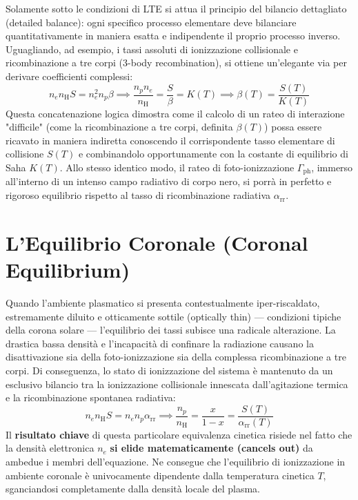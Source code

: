 Solamente sotto le condizioni di LTE si attua il principio del bilancio dettagliato (detailed balance): ogni specifico processo elementare deve bilanciare quantitativamente in maniera esatta e indipendente il proprio processo inverso. Uguagliando, ad esempio, i tassi assoluti di ionizzazione collisionale e ricombinazione a tre corpi (3-body recombination), si ottiene un'elegante via per derivare coefficienti complessi:
\begin{equation}
n_e n_{\text{H}} S = n_e^2 n_p \beta \implies \frac{n_p n_e}{n_{\text{H}}} = \frac{S}{\beta} = K(T) \implies \beta(T) = \frac{S(T)}{K(T)}
\end{equation}
Questa concatenazione logica dimostra come il calcolo di un rateo di interazione "difficile" (come la ricombinazione a tre corpi, definita $\beta(T)$) possa essere ricavato in maniera indiretta conoscendo il corrispondente tasso elementare di collisione $S(T)$ e combinandolo opportunamente con la costante di equilibrio di Saha $K(T)$. Allo stesso identico modo, il rateo di foto-ionizzazione $\Gamma_{\text{ph}}$, immerso all'interno di un intenso campo radiativo di corpo nero, si porrà in perfetto e rigoroso equilibrio rispetto al tasso di ricombinazione radiativa $\alpha_{\text{rr}}$.

\section{L'Equilibrio Coronale (Coronal Equilibrium)}

Quando l'ambiente plasmatico si presenta contestualmente iper-riscaldato, estremamente diluito e otticamente sottile (optically thin) — condizioni tipiche della corona solare — l'equilibrio dei tassi subisce una radicale alterazione. La drastica bassa densità e l'incapacità di confinare la radiazione causano la disattivazione sia della foto-ionizzazione sia della complessa ricombinazione a tre corpi. Di conseguenza, lo stato di ionizzazione del sistema è mantenuto da un esclusivo bilancio tra la ionizzazione collisionale innescata dall'agitazione termica e la ricombinazione spontanea radiativa:
\begin{equation}
n_e n_{\text{H}} S = n_e n_p \alpha_{\text{rr}} \implies \frac{n_p}{n_{\text{H}}} = \frac{x}{1-x} = \frac{S(T)}{\alpha_{\text{rr}}(T)}
\end{equation}
Il \textbf{risultato chiave} di questa particolare equivalenza cinetica risiede nel fatto che la densità elettronica $n_e$ \textbf{si elide matematicamente (cancels out)} da ambedue i membri dell'equazione. Ne consegue che l'equilibrio di ionizzazione in ambiente coronale è univocamente dipendente dalla temperatura cinetica $T$, sganciandosi completamente dalla densità locale del plasma.

